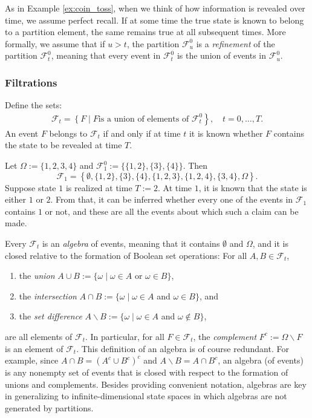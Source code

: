 \documentclass[\topdir/lecture\_notes.tex]{subfiles}
\begin{document}
As in Example \ref{ex:coin_toss}, when we think of how information is revealed over time, we assume perfect recall. If at some time the true state is known to belong to a partition element, the same remains true at all subsequent times. More formally, we assume that if $u>t$, the partition $\mathcal{F}_{u}^{0}$ is a \emph{refinement} of the partition $\mathcal{F}_{t}^{0}$, meaning that every event in $\mathcal{F}_{t}^{0}$ is the union of events in $\mathcal{F}_{u}^{0}$.

\subsubsection*{Filtrations}
Define the sets:
\begin{align}
\mathcal{F}_{t}=\left\{F \mid F\right. \text{is a union of elements of }\left.\mathcal{F}_{t}^{0}\right\}, \quad t=0, \ldots, T.
\end{align}
An event $F$ belongs to $\mathcal{F}_{t}$ if and only if at time $t$ it is known whether $F$ contains the state to be revealed at time $T$.

\begin{example}
Let $\Omega :=\{1,2,3,4\}$ and $\mathcal{F}_{1}^{0} :=\{\{1,2\},\{3\},\{4\}\}$. Then
\[
\mathcal{F}_{1}=\left\{\emptyset,\{1,2\},\{3\},\{4\},\{1,2,3\},\{1,2,4\},\{3,4\}, \Omega \right\}.
\]
Suppose state $1$ is realized at time $T := 2$. At time $1$, it is known that the state is either $1$ or $2$. From that, it can be inferred whether every one of the events in $\mathcal{F}_{1}$ contains $1$ or not, and these are all the events about which such a claim can be made.
\end{example}

Every $\mathcal{F}_{t}$ is an \emph{algebra} of events, meaning that it contains $\emptyset$ and $\Omega$, and it is closed relative to the formation of Boolean set operations: For all $A, B \in \mathcal{F}_{t}$, 
\begin{enumerate}
    \item the \emph{union} $A \cup B :=\{\omega \mid \omega \in A$ or $\omega \in B\}$,
    \item the \emph{intersection} $A \cap B :=\{\omega \mid \omega \in A$ and $\omega \in B\}$, and 
    \item the \emph{set difference} $A \backslash B :=\{\omega \mid \omega \in A$ and $\omega \notin B\}$,
\end{enumerate}
are all elements of $\mathcal{F}_{t}$. In particular, for all $F \in \mathcal{F}_{t}$, the \emph{complement} $F^{c} := \Omega \backslash F$ is an element of $\mathcal{F}_{t}$. This definition of an algebra is of course redundant. For example, since $A \cap B=(A^{c} \cup B^{c})^{c}$ and $A \backslash B=A \cap B^{c}$, an algebra (of events) is any nonempty set of events that is closed with respect to the formation of unions and complements. Besides providing convenient notation, algebras are key in generalizing to infinite-dimensional state spaces in which algebras are not generated by partitions.
\end{document}
